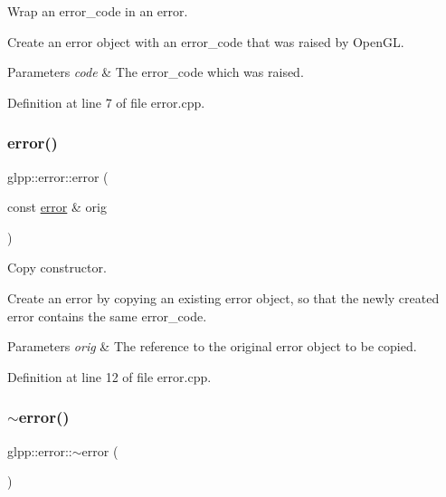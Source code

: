 Wrap an error\+\_\+code in an error. 

Create an error object with an error\+\_\+code that was raised by Open\+GL.


\begin{DoxyParams}{Parameters}
{\em code} & The error\+\_\+code which was raised. \\
\hline
\end{DoxyParams}


Definition at line 7 of file error.\+cpp.

\mbox{\label{classglpp_1_1error_a7ccd8e96ad2f93ac0ec7e3803edab882}} 
\subsubsection{\texorpdfstring{error()}{error()}\hspace{0.1cm}{\footnotesize\ttfamily [3/3]}}
{\footnotesize\ttfamily glpp\+::error\+::error (\begin{DoxyParamCaption}\item[{const \hyperlink{classglpp_1_1error}{error} \&}]{orig }\end{DoxyParamCaption})\hspace{0.3cm}{\ttfamily [noexcept]}}



Copy constructor. 

Create an error by copying an existing error object, so that the newly created error contains the same error\+\_\+code.


\begin{DoxyParams}{Parameters}
{\em orig} & The reference to the original error object to be copied. \\
\hline
\end{DoxyParams}


Definition at line 12 of file error.\+cpp.

\mbox{\label{classglpp_1_1error_a631399936338b9720b1938c8a8eee2a2}} 
\subsubsection{\texorpdfstring{$\sim$error()}{~error()}}
{\footnotesize\ttfamily glpp\+::error\+::$\sim$error (\begin{DoxyParamCaption}{ }\end{DoxyParamCaption})\hspace{0.3cm}{\ttfamily [virtual]}}



